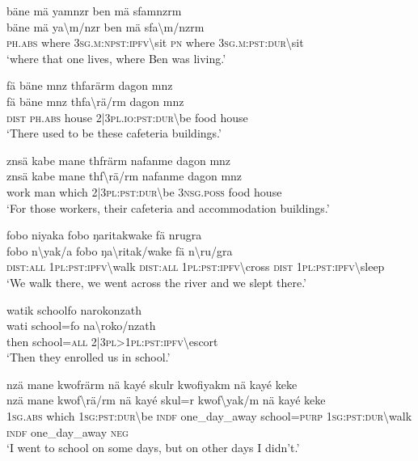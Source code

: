 \ea\label{ex:14:a3086}
bäne mä yamnzr ben mä sfamnzrm\\
\gll bäne	mä	ya{\textbackslash}m/nzr	ben	mä	sfa{\textbackslash}m/nzrm\\
     \textsc{ph}.\textsc{abs}	where	3\textsc{sg}.\textsc{m}:\textsc{npst}:\textsc{ipfv}{\textbackslash}sit	\textsc{pn}	where	3\textsc{sg}.\textsc{m}:\textsc{pst}:\textsc{dur}{\textbackslash}sit\\
\glt `where that one lives, where Ben was living.'
\z

\ea\label{ex:14:a3089}
fä bäne mnz thfarärm dagon mnz\\
\gll fä	bäne	mnz	thfa{\textbackslash}rä/rm	dagon	mnz\\
     \textsc{dist}	\textsc{ph}.\textsc{abs}	house	2|3\textsc{pl}.\textsc{io}:\textsc{pst}:\textsc{dur}{\textbackslash}be	food	house\\
\glt `There used to be these cafeteria buildings.'
\z

\ea\label{ex:14:a3093}
znsä kabe mane thfrärm nafanme dagon mnz\\
\gll znsä	kabe	mane	thf{\textbackslash}rä/rm	nafanme	dagon	mnz\\
     work	man	which	2|3\textsc{pl}:\textsc{pst}:\textsc{dur}{\textbackslash}be	3\textsc{nsg}.\textsc{poss}	food	house\\
\glt `For those workers, their cafeteria and accommodation buildings.'
\z

\ea\label{ex:14:a3095}
fobo niyaka fobo ŋaritakwake fä nrugra\\
\gll fobo	n{\textbackslash}yak/a	fobo	ŋa{\textbackslash}ritak/wake	fä	n{\textbackslash}ru/gra\\
     \textsc{dist}:\textsc{all}	1\textsc{pl}:\textsc{pst}:\textsc{ipfv}{\textbackslash}walk	\textsc{dist}:\textsc{all}	1\textsc{pl}:\textsc{pst}:\textsc{ipfv}{\textbackslash}cross	\textsc{dist}	1\textsc{pl}:\textsc{pst}:\textsc{ipfv}{\textbackslash}sleep\\
\glt `We walk there, we went across the river and we slept there.'
\z

\ea\label{ex:14:a3096}
watik schoolfo narokonzath\\
\gll wati	school=fo	na{\textbackslash}roko/nzath\\
     then	school=\textsc{all}	2|3\textsc{pl}>1\textsc{pl}:\textsc{pst}:\textsc{ipfv}{\textbackslash}escort\\
\glt `Then they enrolled us in school.'
\z

\ea\label{ex:14:a3097}
nzä mane kwofrärm nä kayé skulr kwofiyakm nä kayé keke\\
\gll nzä	mane	kwof{\textbackslash}rä/rm	nä	kayé	skul=r	kwof{\textbackslash}yak/m	nä	kayé	keke\\
     1\textsc{sg}.\textsc{abs}	which	1\textsc{sg}:\textsc{pst}:\textsc{dur}{\textbackslash}be	\textsc{indf}	one\_day\_away	school=\textsc{purp}	1\textsc{sg}:\textsc{pst}:\textsc{dur}{\textbackslash}walk	\textsc{indf}	one\_day\_away	\textsc{neg}\\
\glt `I went to school on some days, but on other days I didn't.'
\z

